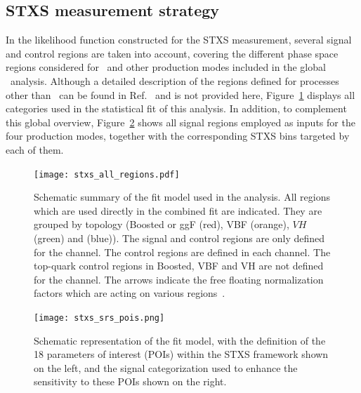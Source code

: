 \subsection{STXS measurement strategy}
\label{stxs_setup}

In the likelihood function constructed for the STXS measurement, several signal and control regions are taken into account, 
covering the different phase space regions considered for \ttHtt\ and other production modes included in the global \htautau\ analysis. 
Although a detailed description of the regions defined for processes other than \ttH\ can be found in Ref.~\cite{differential_htautau} and is not provided here, 
Figure~\ref{fig:stxs_all_regions} displays all categories used in the statistical fit of this analysis. 
In addition, to complement this global overview, Figure~\ref{fig:stxs_srs_pois} shows all signal regions employed as inputs for the four production modes, 
together with the corresponding STXS bins targeted by each of them.

\begin{figure}[htbp]
  \centering
  \texttt{[image: stxs\_all\_regions.pdf]}
  \caption{Schematic summary of the fit model used in the analysis. All regions which are used directly in the combined fit are indicated. They are grouped by topology (Boosted or ggF (red), VBF (orange), $VH$ (green) and \ttH (blue)). The \ttH signal and control regions are only defined for the \tauhadhad channel. The \ztautau control regions are defined in each channel. The top-quark control regions in Boosted, VBF and VH are not defined for the \tauhadhad channel. The arrows indicate the free floating normalization factors which are acting on various regions~\cite{differential_htautau}.}
  \label{fig:stxs_all_regions}
\end{figure}

\begin{figure}[htbp]
  \centering
  \texttt{[image: stxs\_srs\_pois.png]}
  \caption{Schematic representation of the fit model, with the definition of the 18 parameters of interest (POIs) within the STXS framework shown on the left, and the signal categorization used to enhance the sensitivity to these POIs shown on the right.}
  \label{fig:stxs_srs_pois}
\end{figure}


